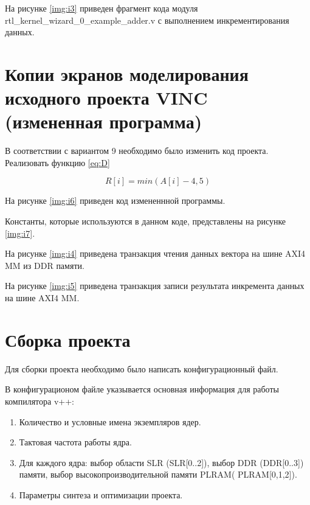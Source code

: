 На рисунке \ref{img:i3} приведен фрагмент кода модуля rtl\_kernel\_wizard\_0\_example\_adder.v с выполнением инкрементирования данных.

\newpage

\chapter*{Копии экранов моделирования исходного проекта VINC (измененная программа)}

В соответствии с вариантом 9 необходимо было изменить код проекта. Реализовать функцию \ref{eq:D}


\begin{equation}
	\label{eq:D}
	R[i] = min(A[i] - 4, 5)
\end{equation}

На рисунке \ref{img:i6} приведен код измененнной программы.


Константы, которые используются в данном коде, представлены на рисунке \ref{img:i7}.


На рисунке \ref{img:i4} приведена транзакция чтения данных вектора на шине AXI4 MM из DDR памяти.

\newpage

На рисунке \ref{img:i5} приведена транзакция записи результата инкремента данных на шине AXI4 MM.



\chapter*{Сборка проекта}

Для сборки проекта необходимо было написать конфигурационный файл.

В конфигурационом файле указывается основная информация для работы компилятора v++:

\begin{enumerate}
	\item Количество и условные имена экземпляров ядер.
	\item Тактовая частота работы ядра.
	\item Для каждого ядра: выбор области SLR (SLR[0..2]), выбор DDR (DDR[0..3]) памяти, выбор высокопроизводительной памяти PLRAM( PLRAM[0,1,2]).
	\item Параметры синтеза и оптимизации проекта.
\end{enumerate}

